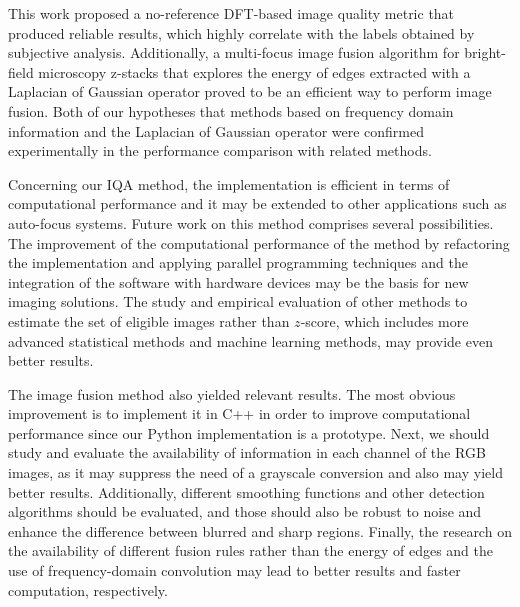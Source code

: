This work proposed a no-reference DFT-based image quality metric that produced reliable results, which highly correlate with the labels obtained by subjective analysis. Additionally, a multi-focus image fusion algorithm for bright-field microscopy z-stacks that explores the energy of edges extracted with a Laplacian of Gaussian operator proved to be an efficient way to perform image fusion. Both of our hypotheses that methods based on frequency domain information and the Laplacian of Gaussian operator were confirmed experimentally in the performance comparison with related methods.

Concerning our IQA method, the implementation is efficient in terms of computational performance and it may be extended to other applications such as auto-focus systems. Future work on this method comprises several possibilities. The improvement of the computational performance of the method by refactoring the implementation and applying parallel programming techniques and the integration of the software with hardware devices may be the basis for new imaging solutions. The study and empirical evaluation of other methods to estimate the set of eligible images rather than $z$-score, which includes more advanced statistical methods and machine learning methods, may provide even better results.

The image fusion method also yielded relevant results. The most obvious improvement is to implement it in C++ in order to improve computational performance since our Python implementation is a prototype. Next, we should study and evaluate the availability of information in each channel of the RGB images, as it may suppress the need of a grayscale conversion and also may yield better results. Additionally, different smoothing functions and other detection algorithms should be evaluated, and those should also be robust to noise and enhance the difference between blurred and sharp regions. Finally, the research on the availability of different fusion rules rather than the energy of edges and the use of frequency-domain convolution may lead to better results and faster computation, respectively.